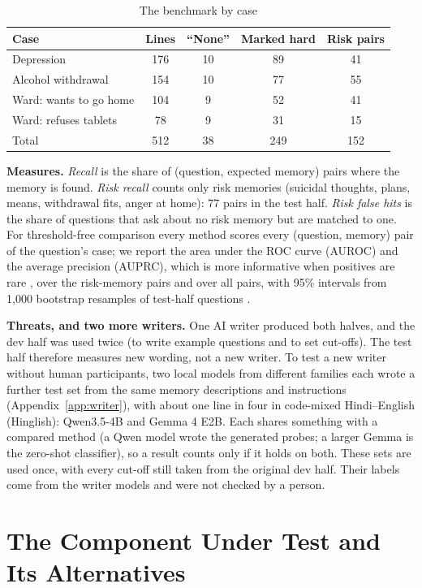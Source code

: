 \documentclass[sn-mathphys-num]{sn-jnl}
\begin{document}
\begin{table}[t]
\caption{The benchmark by case}
\label{tab:benchstats}
\footnotesize
\begin{tabular*}{\linewidth}{@{\extracolsep{\fill}}lcccc@{}}
\toprule
Case & Lines & ``None'' & Marked hard & Risk pairs\\
\midrule
Depression & 176 & 10 & 89 & 41\\
Alcohol withdrawal & 154 & 10 & 77 & 55\\
Ward: wants to go home & 104 & 9 & 52 & 41\\
Ward: refuses tablets & 78 & 9 & 31 & 15\\
\midrule
Total & 512 & 38 & 249 & 152\\
\bottomrule
\end{tabular*}
\end{table}

\textbf{Measures.} \emph{Recall} is the share of (question, expected memory) pairs where the memory is found. \emph{Risk recall} counts only risk
memories (suicidal thoughts, plans, means, withdrawal fits, anger at home): 77 pairs in the test half. \emph{Risk false hits} is the share of
questions that ask about no risk memory but are matched to one. For threshold-free comparison every method scores every (question, memory)
pair of the question's case; we report the area under the ROC curve (AUROC) and the average precision (AUPRC), which is more informative when positives are rare \cite{saito2015prc}, over the risk-memory pairs and over
all pairs, with 95\% intervals from 1,000 bootstrap resamples of test-half questions \cite{efron1993bootstrap}.

\textbf{Threats, and two more writers.} One AI writer produced both halves, and the dev half was used twice (to write example questions and to
set cut-offs). The test half therefore measures new wording, not a new writer. To test a new writer without human participants, two local models
from different families each wrote a further test set from the same memory descriptions and instructions (Appendix~\ref{app:writer}), with about
one line in four in code-mixed Hindi--English (Hinglish): Qwen3.5-4B and Gemma 4 E2B. Each shares something with a compared method (a Qwen model
wrote the generated probes; a larger Gemma is the zero-shot classifier), so a result counts only if it holds on both. These sets are used once,
with every cut-off still taken from the original dev half. Their labels come from the writer models and were not checked by a person.

\section{The Component Under Test and Its Alternatives}\label{sec:method}
\end{document}
